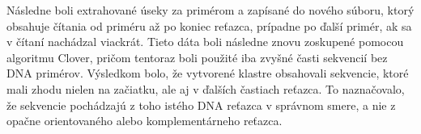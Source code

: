 
Následne boli extrahované úseky za primérom a zapísané do nového súboru, ktorý obsahuje čítania od priméru až po koniec reťazca, prípadne po ďalší primér, ak sa v čítaní nachádzal viackrát.
Tieto dáta boli následne znovu zoskupené pomocou algoritmu Clover, pričom tentoraz boli použité iba zvyšné časti sekvencií bez DNA primérov.
Výsledkom bolo, že vytvorené klastre obsahovali sekvencie, ktoré mali zhodu nielen na začiatku, ale aj v ďalších častiach reťazca. To naznačovalo, že sekvencie pochádzajú z toho istého DNA reťazca v správnom smere, a nie z opačne orientovaného alebo komplementárneho reťazca.
